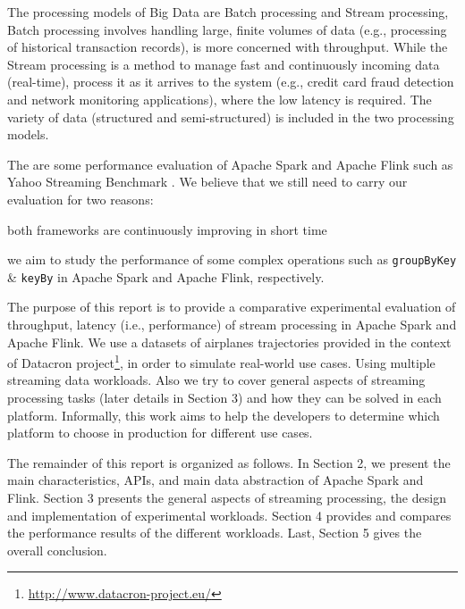 \documentclass[]{article}
\begin{document}
\par The processing models of Big Data are Batch processing and Stream processing, Batch processing involves handling  large, finite volumes of data (e.g., processing of historical transaction records), is more concerned with throughput. While the Stream processing  is a method to manage fast and continuously incoming data (real-time), process it as it arrives to the system (e.g., credit card fraud detection and network monitoring applications), where the low latency is required. The variety of data (structured and semi-structured) is included in the two processing models.

\par The are some performance evaluation of Apache Spark and Apache Flink  such as Yahoo Streaming Benchmark \cite{yahoo}. We believe that we still need to carry our evaluation for two reasons: \begin{enumerate*}[label=(\roman*)]
\item both frameworks are continuously improving in short time 
\item we aim to study the performance of some complex operations such as \texttt{groupByKey} \& \texttt{keyBy} in Apache Spark and Apache Flink, respectively.
\end{enumerate*}

 

\par The purpose of this report is to provide a comparative experimental evaluation of throughput, latency (i.e., performance) of stream processing in Apache Spark and Apache Flink. We use a datasets of airplanes trajectories provided in the context of Datacron project\footnote{\url{http://www.datacron-project.eu/}}, in order to simulate real-world use cases. Using multiple streaming data workloads. Also we try to cover general aspects of streaming processing tasks (later details in Section 3) and how they can be solved in each platform. Informally,  this work aims to help the developers to determine which platform to choose in production for different use cases. 


\par The remainder of this report is organized as follows.
In Section 2, we present the main characteristics, APIs, and main data abstraction of Apache Spark and Flink. Section 3  presents the general aspects of streaming processing, the design and implementation of experimental workloads. Section 4
provides and compares the performance results of the different workloads. Last, Section 5 gives the overall conclusion.
\end{document}

